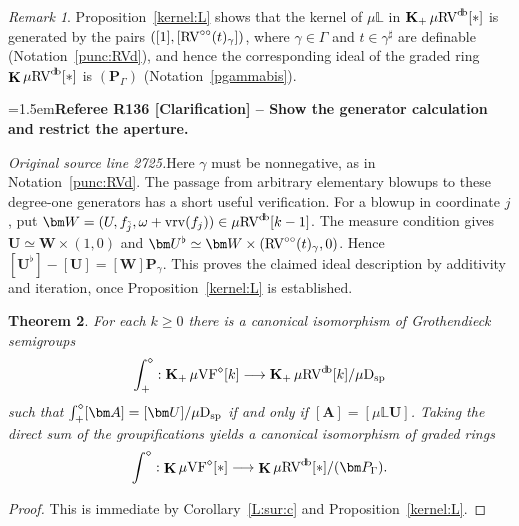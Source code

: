 \documentclass[12pt]{amsart}
\newcommand{\RefereeRemark}[4]{%
  \par\medskip\begingroup\normalfont\small\color{RefereePurple}%
  \emergencystretch=1.5em\noindent\textbf{Referee R#1 [#2] -- #3.}\par\nobreak\noindent #4\par
  \endgroup\medskip
}
\theoremstyle{plain}
\newtheorem{thm}{Theorem}[section]
\theoremstyle{definition}
\theoremstyle{remark}
\newtheorem{rem}[thm]{Remark}
\numberwithin{equation}{section}
\theoremstyle{plain}
\newcommand{\VF}{\textup{VF}}
\newcommand{\RV}{\textup{RV}}
\newcommand{\0}{\emptyset}
\newcommand{\bb}[1]{\mathbb{#1}}
\newcommand{\fun}{\longrightarrow}
\newcommand{\mVF}{{\mu}{\VF}}
\newcommand{\mRV}{{\mu}{\RV}}
\newcommand{\dsp}{\textup{D}_{\textup{sp}}}
\newcommand{\mispdb}{\mu \dsp}
\newcommand{\mL}{{\mu}{\bb L}}
\DeclareMathOperator{\gsk}{\mathbf{K}_+}
\DeclareMathOperator{\ggk}{\mathbf{K}}
\DeclareMathOperator{\vrv}{vrv}
\DeclareMathOperator{\db}{d \! b}
\newcommand{\ccirc}{\circ \circ}
\begin{document}
\begin{rem}\label{thekernel}
Proposition~\ref{kernel:L} shows that  the kernel  of $\mL$ in $\gsk \mRV^{\db}[*]$ is generated by the pairs $([1], [\RV^{\ccirc}(t)_\gamma])$, where $\gamma \in \Gamma$ and $t \in \gamma^\sharp$ are definable (Notation~\ref{punc:RVd}), and hence  the corresponding ideal of the graded ring $\ggk \mRV^{\db}[*]$  is $(\bm P_\Gamma)$ (Notation~\ref{pgammabis}).

\RefereeRemark{136}{Clarification}{Show the generator calculation and restrict the aperture}{%
\textit{Original source line 2725.}\quad Here $\gamma$ must be nonnegative, as in Notation~\ref{punc:RVd}. The passage from arbitrary elementary blowups to these degree-one generators has a short useful verification. For a blowup in coordinate $j$, put $\bm W=(U,f_{\tilde j},\omega+\vrv(f_j))\in\mRV^{\db}[k-1]$. The measure condition gives $\bm U\simeq\bm W\times(1,0)$ and $\bm U^\flat\simeq\bm W\times(\RV^{\ccirc}(t)_\gamma,0)$. Hence $[\bm U^\flat]-[\bm U]=[\bm W]\bm P_\gamma$. This proves the claimed ideal description by additivity and iteration, once Proposition~\ref{kernel:L} is established.
}
\end{rem}

\begin{thm}\label{main:prop}
For each $k \geq 0$ there is a canonical isomorphism of Grothendieck semigroups
\[
  \int^{\diamond}_+ : \gsk \mVF^\diamond[k] \fun \gsk  \mRV^{\db}[k] /  \mispdb
\]
such that $\int_{+}^{\diamond} [\bm A] = [\bm U]/  \mispdb$ if and only if $[\bm A] = [{\mL}\bm U]$. Taking the direct sum of the groupifications
yields a canonical isomorphism of graded rings
\[
  \int^{\diamond} : \ggk \mVF^\diamond[*] \fun \ggk  \mRV^{\db}[*] /  (\bm P_\Gamma).
\]
\end{thm}
\begin{proof}
This is immediate by Corollary~\ref{L:sur:c} and Proposition~\ref{kernel:L}.
\end{proof}
\end{document}
